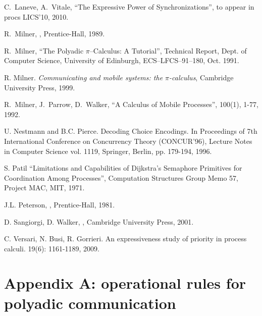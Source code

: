 \documentclass[submission,copyright,creativecommons]{eptcs}
\begin{document}
\begin{thebibliography}{10}
C.~Laneve, A.~Vitale,
\newblock ``The Expressive Power of Synchronizations'',
\newblock to appear in procs LICS'10, 2010.

R.~Milner,
,
\newblock Prentice-Hall, 1989.

R.~Milner,
\newblock ``The Polyadic $\pi$--Calculus: A Tutorial'',
\newblock Technical Report, Dept. of Computer Science,
  University of Edinburgh, ECS--LFCS--91--180, Oct. 1991.

 R. Milner. {\it Communicating and mobile systems: the
$\pi$-calculus},
Cambridge University Press, 1999.

R.~Milner, J.~Parrow, D.~Walker,
\newblock ``A Calculus of Mobile Processes'',
 100(1), 1-77, 1992.

U. Nestmann and B.C. Pierce.
\newblock Decoding Choice Encodings.
\newblock In {Proceedings of 7th International Conference on Concurrency Theory (CONCUR'96)},
Lecture Notes in Computer Science vol. 1119, Springer, Berlin, pp. 179-194, 1996.

S. Patil
\newblock ``Limitations and Capabilities of Dijkstra's Semaphore 
Primitives for Coordination Among Processes'',
\newblock Computation Structures Group Memo 57, Project MAC, MIT, 1971.

J.L. Peterson,
, Prentice-Hall, 1981.

D. Sangiorgi, D. Walker,
,
\newblock Cambridge University Press, 2001.

C. Versari, N. Busi, R. Gorrieri.
\newblock An expressiveness study of priority in process calculi. 
 19(6): 1161-1189, 2009.


\end{thebibliography}





\section*{Appendix A: operational rules for polyadic communication}
\end{document}
